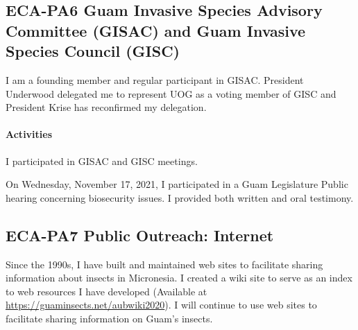 \subsection{ECA-PA6 Guam Invasive Species Advisory Committee (GISAC) and Guam Invasive Species Council (GISC)}
	
I am a founding member and regular participant in GISAC. President Underwood delegated me to represent UOG as a voting member of GISC and President Krise has reconfirmed my delegation.

\paragraph{Activities}

I participated in GISAC and GISC meetings.

On Wednesday, November 17, 2021, I participated in a Guam Legislature Public hearing concerning biosecurity issues. I provided both written and oral testimony.
\begin{comment}
\paragraph{Plans for 15JUN2021-14JUN2022}

I plan to continue as an active member of GISAC and GISC.

I plan to participate in a review of the Guam Invasive Species Management Plan.

\paragraph{Plans for 15JUN2022-14JUN2023}

I plan to continue as an active member of GISAC and GISC.

I plan to participate in a review of the Guam Invasive Species Management Plan.
\end{comment}
\subsection{ECA-PA7 Public Outreach: Internet}

Since the 1990s, I have built and maintained web sites to facilitate sharing information about insects in Micronesia. I created a wiki site to serve as an index to web resources I have developed (Available at  \url{https://guaminsects.net/aubwiki2020}). I will continue to use web sites to facilitate sharing information on Guam's insects.
\begin{comment}
\paragraph{Plans for 15JUN2021-14JUN2022}
I will continue to create and maintain websites about insects in Micronesia.

\paragraph{Plans for 15JUN2022-14JUN2023}
I will continue to create and maintain websites about insects in Micronesia.
\end{comment}
